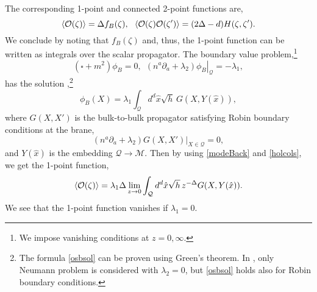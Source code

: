 \documentclass[reprint,amsmath,amssymb,aps,nofootinbib,twocolumn]{revtex4-2}
\newcommand{\sanjit}[1]{\textcolor{red}{\textbf{??SS:} #1}}
\newcommand{\jani}[1]{\textcolor{blue}{\textbf{??JK:} #1}}
\begin{document}
The corresponding 1-point and connected 2-point functions are,
\begin{equation}
\expval{\mathcal{O}(\zeta)} = \Delta f_B(\zeta),\ \ \expval{\mathcal{O}(\zeta)\mathcal{O}(\zeta')} = (2\Delta -d) H(\zeta,\zeta').
\label{holcols}
\end{equation}
We conclude by noting that $f_B(\zeta)$ and, thus, the 1-point function can be written as integrals over the scalar propagator. The boundary value problem,\footnote{We impose vanishing conditions at $ z=0,\infty $.}
\begin{equation}
(\square + m^2)\phi_B = 0,\ \ \left.(n^a \partial_a + \lambda_2) \phi_B\right|_{\mathcal{Q}} = -\lambda_1,
\end{equation}
has the solution \cite{mcavity_heat_1992,mcavity_surface_1993},\footnote{The formula \eqref{osbsol} can be proven using Green's theorem. In \cite{mcavity_heat_1992,mcavity_surface_1993}, only Neumann problem is considered with $ \lambda_2 = 0 $, but \eqref{osbsol} holds also for Robin boundary conditions.}
\begin{equation}
\phi_B(X) = \lambda_1 \int_{\mathcal{Q}} d^d \hat{x}\sqrt{h}\,G(X,Y(\hat{x})),
\label{osbsol}
\end{equation}
where $ G(X,X') $ is the bulk-to-bulk propagator satisfying Robin boundary conditions at the brane,
\begin{equation}
(n^{a}\partial_a + \lambda_2)G(X,X')\lvert_{X\in\mathcal{Q}} = 0,
\label{Gneumann}
\end{equation}
and $Y(\hat{x})$ is the embedding $\mathcal{Q} \to \mathcal{M}$. Then by using \eqref{modeBack} and \eqref{holcols}, we get the 1-point function,
\begin{equation}
\expval{\mathcal{O}(\zeta)} = \lambda_1\Delta  \lim_{z\to 0}\int_{\mathcal{Q}}d^d\hat{x} \sqrt{h}\,z^{-\Delta}G(X,Y(\hat{x})).\label{propOP}
\end{equation}
We see that the 1-point function vanishes if $ \lambda_1 = 0 $. %
\end{document}
